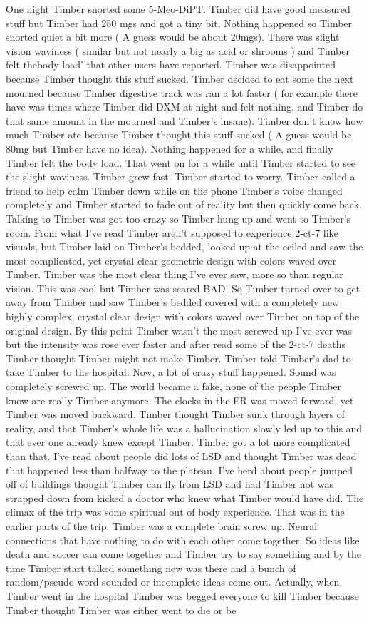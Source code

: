 \documentclass[12pt]{book}
\begin{document}
One night Timber snorted some 5-Meo-DiPT. Timber did have good measured stuff but Timber had 250 mgs and got a tiny bit. Nothing happened so Timber snorted quiet a bit more ( A guess would be about 20mgs). There was slight vision waviness ( similar but not nearly a big as acid or shrooms ) and Timber felt thebody load' that other users have reported. Timber was disappointed because Timber thought this stuff sucked. Timber decided to eat some the next mourned because Timber digestive track was ran a lot faster ( for example there have was times where Timber did DXM at night and felt nothing, and Timber do that same amount in the mourned and Timber's insane). Timber don't know how much Timber ate because Timber thought this stuff sucked ( A guess would be 80mg but Timber have no idea). Nothing happened for a while, and finally Timber felt the body load. That went on for a while until Timber started to see the slight waviness. Timber grew fast. Timber started to worry. Timber called a friend to help calm Timber down while on the phone Timber's voice changed completely and Timber started to fade out of reality but then quickly come back. Talking to Timber was got too crazy so Timber hung up and went to Timber's room. From what I've read Timber aren't supposed to experience 2-ct-7 like visuals, but Timber laid on Timber's bedded, looked up at the ceiled and saw the most complicated, yet crystal clear geometric design with colors waved over Timber. Timber was the most clear thing I've ever saw, more so than regular vision. This was cool but Timber was scared BAD. So Timber turned over to get away from Timber and saw Timber's bedded covered with a completely new highly complex, crystal clear design with colors waved over Timber on top of the original design. By this point Timber wasn't the most screwed up I've ever was but the intensity was rose ever faster and after read some of the 2-ct-7 deaths Timber thought Timber might not make Timber. Timber told Timber's dad to take Timber to the hospital. Now, a lot of crazy stuff happened. Sound was completely screwed up. The world became a fake, none of the people Timber know are really Timber anymore. The clocks in the ER was moved forward, yet Timber was moved backward. Timber thought Timber sunk through layers of reality, and that Timber's whole life was a hallucination slowly led up to this and that ever one already knew except Timber. Timber got a lot more complicated than that. I've read about people did lots of LSD and thought Timber was dead that happened less than halfway to the plateau. I've herd about people jumped off of buildings thought Timber can fly from LSD and had Timber not was strapped down from kicked a doctor who knew what Timber would have did. The climax of the trip was some spiritual out of body experience. That was in the earlier parts of the trip. Timber was a complete brain screw up. Neural connections that have nothing to do with each other come together. So ideas like death and soccer can come together and Timber try to say something and by the time Timber start talked something new was there and a bunch of random/pseudo word sounded or incomplete ideas come out. Actually, when Timber went in the hospital Timber was begged everyone to kill Timber because Timber thought Timber was either went to die or be 
\end{document}
